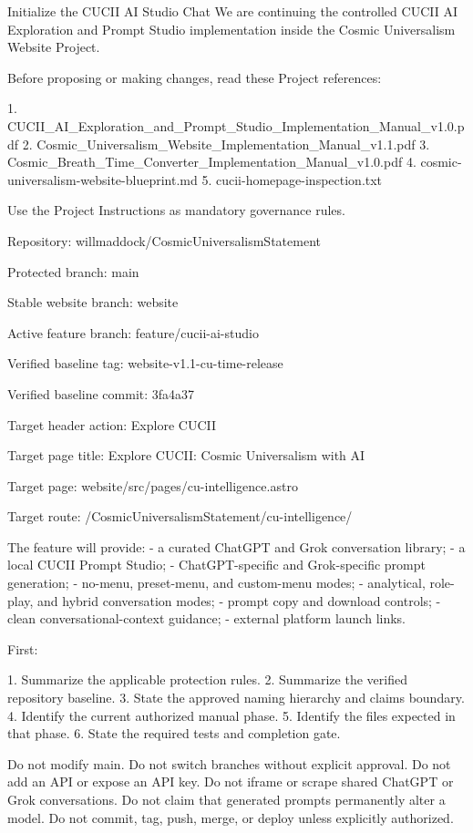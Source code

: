 \documentclass[11pt,letterpaper]{article}
\begin{document}
\begin{promptbox}{Initialize the CUCII AI Studio Chat}
We are continuing the controlled CUCII AI Exploration and Prompt
Studio implementation inside the Cosmic Universalism Website Project.

Before proposing or making changes, read these Project references:

1. CUCII_AI_Exploration_and_Prompt_Studio_Implementation_Manual_v1.0.pdf
2. Cosmic_Universalism_Website_Implementation_Manual_v1.1.pdf
3. Cosmic_Breath_Time_Converter_Implementation_Manual_v1.0.pdf
4. cosmic-universalism-website-blueprint.md
5. cucii-homepage-inspection.txt

Use the Project Instructions as mandatory governance rules.

Repository:
willmaddock/CosmicUniversalismStatement

Protected branch:
main

Stable website branch:
website

Active feature branch:
feature/cucii-ai-studio

Verified baseline tag:
website-v1.1-cu-time-release

Verified baseline commit:
3fa4a37

Target header action:
Explore CUCII

Target page title:
Explore CUCII: Cosmic Universalism with AI

Target page:
website/src/pages/cu-intelligence.astro

Target route:
/CosmicUniversalismStatement/cu-intelligence/

The feature will provide:
- a curated ChatGPT and Grok conversation library;
- a local CUCII Prompt Studio;
- ChatGPT-specific and Grok-specific prompt generation;
- no-menu, preset-menu, and custom-menu modes;
- analytical, role-play, and hybrid conversation modes;
- prompt copy and download controls;
- clean conversational-context guidance;
- external platform launch links.

First:

1. Summarize the applicable protection rules.
2. Summarize the verified repository baseline.
3. State the approved naming hierarchy and claims boundary.
4. Identify the current authorized manual phase.
5. Identify the files expected in that phase.
6. State the required tests and completion gate.

Do not modify main.
Do not switch branches without explicit approval.
Do not add an API or expose an API key.
Do not iframe or scrape shared ChatGPT or Grok conversations.
Do not claim that generated prompts permanently alter a model.
Do not commit, tag, push, merge, or deploy unless explicitly authorized.
\end{promptbox}
\end{document}
